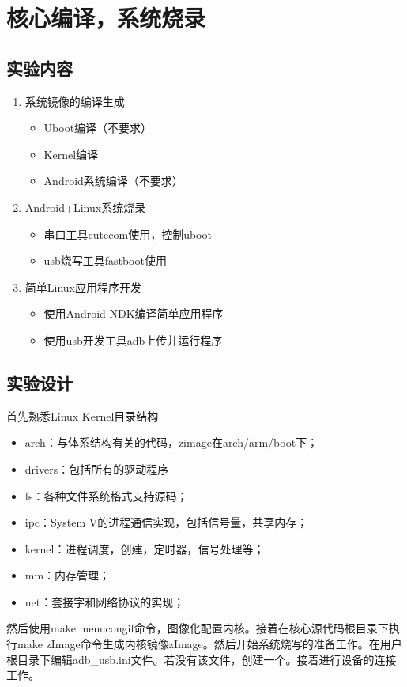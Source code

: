 \documentclass{report}
\begin{document}


\chapter{核心编译，系统烧录}
\section{实验内容}

\begin{enumerate}
    \item 系统镜像的编译生成
        \begin{itemize}
            \item Uboot编译（不要求）
            \item Kernel编译
            \item Android系统编译（不要求）
        \end{itemize}
    \item Android+Linux系统烧录
        \begin{itemize}
            \item 串口工具cutecom使用，控制uboot
            \item usb烧写工具fastboot使用
        \end{itemize}
    \item 简单Linux应用程序开发
        \begin{itemize}
            \item 使用Android NDK编译简单应用程序
            \item 使用usb开发工具adb上传并运行程序
        \end{itemize}
\end{enumerate}

\section{实验设计}
\par 首先熟悉Linux Kernel目录结构
\begin{itemize}
    \item arch：与体系结构有关的代码，zimage在arch/arm/boot下；
    \item drivers：包括所有的驱动程序
    \item fs：各种文件系统格式支持源码；
    \item ipc：System V的进程通信实现，包括信号量，共享内存；
    \item kernel：进程调度，创建，定时器，信号处理等；
    \item mm：内存管理；
    \item net：套接字和网络协议的实现；
\end{itemize}
\par 然后使用make menucongif命令，图像化配置内核。接着在核心源代码根目录下执行make zImage命令生成内核镜像zImage。然后开始系统烧写的准备工作。在用户根目录下编辑adb\_usb.ini文件。若没有该文件，创建一个。接着进行设备的连接工作。
\end{document}
